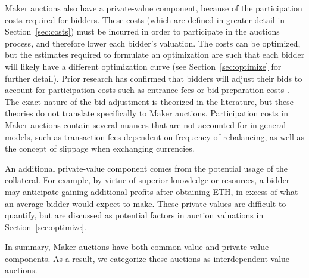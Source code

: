 \documentclass[conference]{IEEEtran}
\begin{document}
Maker auctions also have a private-value component, because of the participation costs required for bidders. These costs (which are defined in greater detail in Section~\ref{sec:costs}) must be incurred in order to participate in the auctions process, and therefore lower each bidder's valuation. The costs can be optimized, but the estimates required to formulate an optimization are such that each bidder will likely have a different optimization curve (see Section~\ref{sec:optimize} for further detail). Prior research has confirmed that bidders will adjust their bids to account for participation costs such as entrance fees or bid preparation costs \cite{entryCosts, bidPrepCosts}. The exact nature of the bid adjustment is theorized in the literature, but these theories do not translate specifically to Maker auctions. Participation costs in Maker auctions contain several nuances that are not accounted for in general models, such as transaction fees dependent on frequency of rebalancing, as well as the concept of slippage when exchanging currencies.

An additional private-value component comes from the potential usage of the collateral. For example, by virtue of superior knowledge or resources, a bidder may anticipate gaining additional profits after obtaining ETH, in excess of what an average bidder would expect to make. These private values are difficult to quantify, but are discussed as potential factors in auction valuations in Section~\ref{sec:optimize}.

In summary, Maker auctions have both common-value and private-value components. As a result, we categorize these auctions as interdependent-value auctions.
\end{document}
